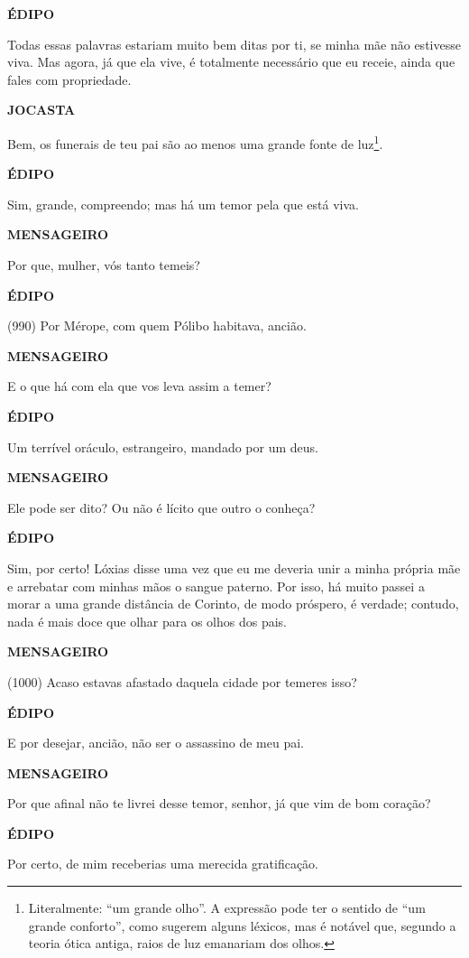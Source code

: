 \textbf{ÉDIPO}

Todas essas palavras estariam muito bem ditas por ti, se minha mãe não
estivesse viva. Mas agora, já que ela vive, é totalmente necessário que
eu receie, ainda que fales com propriedade.

\textbf{JOCASTA}

Bem, os funerais de teu pai são ao menos uma grande fonte de
luz\footnote{Literalmente: ``um grande olho''. A expressão pode ter o
  sentido de ``um grande conforto'', como sugerem alguns léxicos, mas é
  notável que, segundo a teoria ótica antiga, raios de luz emanariam dos
  olhos.}.

\textbf{ÉDIPO}

Sim, grande, compreendo; mas há um temor pela que está viva.

\textbf{MENSAGEIRO}

Por que, mulher, vós tanto temeis?

\textbf{ÉDIPO}

(990) Por Mérope, com quem Pólibo habitava, ancião.

\textbf{MENSAGEIRO}

E o que há com ela que vos leva assim a temer?

\textbf{ÉDIPO}

Um terrível oráculo, estrangeiro, mandado por um deus.

\textbf{MENSAGEIRO}

Ele pode ser dito? Ou não é lícito que outro o conheça?

\textbf{ÉDIPO}

Sim, por certo! Lóxias disse uma vez que eu me deveria unir a minha
própria mãe e arrebatar com minhas mãos o sangue paterno. Por isso, há
muito passei a morar a uma grande distância de Corinto, de modo
próspero, é verdade; contudo, nada é mais doce que olhar para os olhos
dos pais.

\textbf{MENSAGEIRO}

(1000) Acaso estavas afastado daquela cidade por temeres isso?

\textbf{ÉDIPO}

E por desejar, ancião, não ser o assassino de meu pai.

\textbf{MENSAGEIRO}

Por que afinal não te livrei desse temor, senhor, já que vim de bom
coração?

\textbf{ÉDIPO}

Por certo, de mim receberias uma merecida gratificação.

